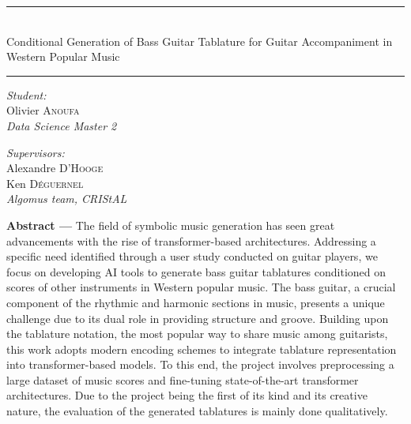 \begin{titlepage}
\begin{minipage}{\linewidth}
\huge
\bfseries
\centering
\rule{\linewidth}{1.5pt}\\
Conditional Generation of Bass Guitar Tablature for Guitar Accompaniment in Western Popular Music\\[-3mm]
\rule{\linewidth}{1.5pt}
\end{minipage}

\vfill

\begin{minipage}{.45\linewidth}
\textit{Student:}\\
Olivier \textsc{Anoufa}\\
\textit{Data Science Master 2}

\end{minipage}
\hfill
\begin{minipage}{.45\linewidth}
\flushright
\textit{Supervisors:}\\
Alexandre \textsc{D'Hooge}\\
Ken \textsc{Déguernel}\\
\textit{Algomus team, CRIStAL}
\end{minipage}

\vfill

\begin{flushleft}
\justify
\textbf{Abstract ---} The field of symbolic music generation has seen great advancements with the rise of transformer-based architectures.
Addressing a specific need identified through a user study conducted on guitar players, we focus on developing AI tools to generate bass guitar tablatures conditioned on scores of other instruments in Western popular music.
The bass guitar, a crucial component of the rhythmic and harmonic sections in music, presents a unique challenge due to its dual role in providing structure and groove.
Building upon the tablature notation, the most popular way to share music among guitarists, this work adopts modern encoding schemes to integrate tablature representation into transformer-based models.
To this end, the project involves preprocessing a large dataset of music scores and fine-tuning state-of-the-art transformer architectures.
Due to the project being the first of its kind and its creative nature, the evaluation of the generated tablatures is mainly done qualitatively.
\vspace{.5\baselineskip}\\
\end{flushleft}
\vfill



\end{titlepage}
